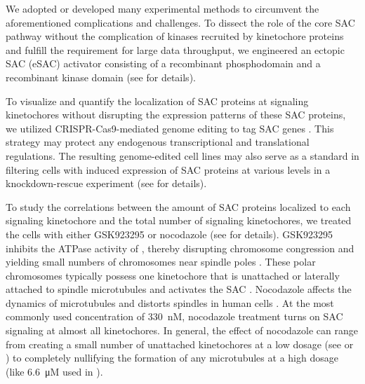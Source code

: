 We adopted or developed many experimental methods to circumvent the aforementioned complications and challenges. To dissect the role of the core SAC pathway without the complication of kinases recruited by kinetochore proteins and fulfill the requirement for large data throughput, we engineered an ectopic SAC (eSAC) activator consisting of a recombinant  phosphodomain and a recombinant  kinase domain (see  for details).

To visualize and quantify the localization of SAC proteins at signaling kinetochores without disrupting the expression patterns of these SAC proteins, we utilized CRISPR-Cas9-mediated genome editing to tag SAC genes  \cite{HDRTiming}. This strategy may protect any endogenous transcriptional and translational regulations. The resulting genome-edited cell lines may also serve as a standard in filtering cells with induced expression of SAC proteins at various levels in a knockdown-rescue experiment (see  for details).

To study the correlations between the amount of SAC proteins localized to each signaling kinetochore and the total number of signaling kinetochores, we treated the cells with either GSK923295 or nocodazole (see  for details). GSK923295 inhibits the ATPase activity of , thereby disrupting chromosome congression and yielding small numbers of chromosomes near spindle poles \cite{GSK923295}. These polar chromosomes typically possess one kinetochore that is unattached or laterally attached to spindle microtubules and activates the SAC \cite{GSK923295MonastrolCotreatment, GSK923295LateralAttachmentEM, LateralAttachmentSAC}. Nocodazole affects the dynamics of microtubules and distorts spindles in human cells \cite{TypeIIISpindle_330nMNoc, RPE1+Noc}. At the most commonly used concentration of \SI{330}{nM}, nocodazole treatment turns on SAC signaling at almost all kinetochores. In general, the effect of nocodazole can range from creating a small number of unattached kinetochores at a low dosage (see \cite{Ablation, RZZ-MAD1vsBUB1-MAD1_2015} or ) to completely nullifying the formation of any microtubules at a high dosage (like \SI{6.6}{\micro M} used in ).